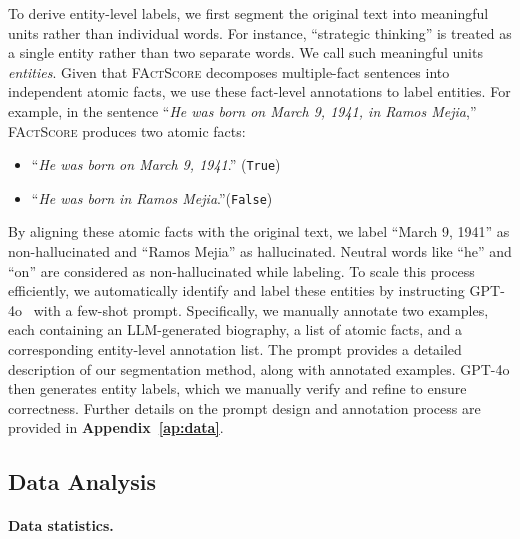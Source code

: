 To derive entity-level labels, we first segment the original text into meaningful units rather than individual words. For instance, ``strategic thinking'' is treated as a single entity rather than two separate words. We call such meaningful units \emph{entities}. Given that \textsc{FActScore} decomposes multiple-fact sentences into independent atomic facts, we use these fact-level annotations to label entities. For example, in the sentence ``\emph{He was born on March 9, 1941, in Ramos Mejia},'' \textsc{FActScore} produces two atomic facts:
\vspace{-0.2cm}
\begin{itemize}
    \item ``\emph{He was born on March 9, 1941}.'' (\texttt{True})
    \vspace{-0.3cm}
    \item ``\emph{He was born in Ramos Mejia}.''(\texttt{False})
\end{itemize}
\vspace{-0.2cm}
By aligning these atomic facts with the original text, we label ``March 9, 1941'' as non-hallucinated and ``Ramos Mejia'' as hallucinated. Neutral words like ``he'' and ``on'' are considered as non-hallucinated while labeling. To scale this process efficiently, we automatically identify and label these entities by instructing GPT-4o~\citep{openai2024gpt4ocard} with a few-shot prompt. Specifically, we manually annotate two examples, each containing an LLM-generated biography, a list of atomic facts, and a corresponding entity-level annotation list. The prompt provides a detailed description of our segmentation method, along with annotated examples. GPT-4o then generates entity labels, which we manually verify and refine to ensure correctness. Further details on the prompt design and annotation process are provided in \textbf{Appendix~\ref{ap:data}}.














\subsection{Data Analysis}\label{sec:data_analysis}

\paragraph{Data statistics.}

